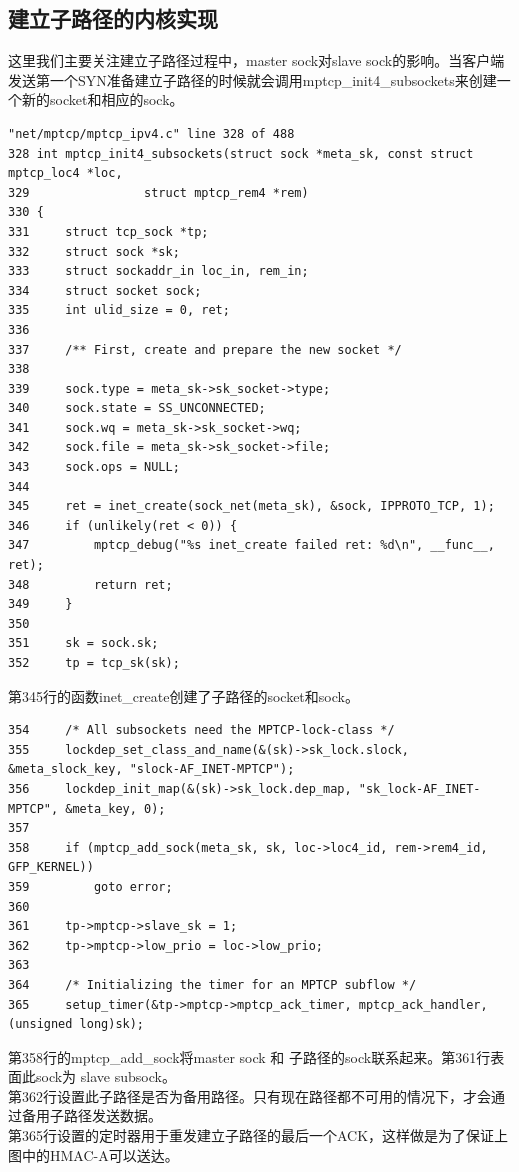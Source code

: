 \subsection{建立子路径的内核实现}
这里我们主要关注建立子路径过程中，master sock对slave sock的影响。当客户端发送第一个SYN准备建立子路径的时候就会调用mptcp\_init4\_subsockets来创建一个新的socket和相应的sock。
\small\begin{verbatim}
"net/mptcp/mptcp_ipv4.c" line 328 of 488
328 int mptcp_init4_subsockets(struct sock *meta_sk, const struct mptcp_loc4 *loc,
329                struct mptcp_rem4 *rem)
330 {
331     struct tcp_sock *tp;
332     struct sock *sk;
333     struct sockaddr_in loc_in, rem_in;
334     struct socket sock;
335     int ulid_size = 0, ret;
336
337     /** First, create and prepare the new socket */
338
339     sock.type = meta_sk->sk_socket->type;
340     sock.state = SS_UNCONNECTED;
341     sock.wq = meta_sk->sk_socket->wq;
342     sock.file = meta_sk->sk_socket->file;
343     sock.ops = NULL;
344
345     ret = inet_create(sock_net(meta_sk), &sock, IPPROTO_TCP, 1);
346     if (unlikely(ret < 0)) {
347         mptcp_debug("%s inet_create failed ret: %d\n", __func__, ret);
348         return ret;
349     }
350
351     sk = sock.sk;
352     tp = tcp_sk(sk);
\end{verbatim}\normalsize
第345行的函数inet\_create创建了子路径的socket和sock。
\small\begin{verbatim}
354     /* All subsockets need the MPTCP-lock-class */
355     lockdep_set_class_and_name(&(sk)->sk_lock.slock, &meta_slock_key, "slock-AF_INET-MPTCP");
356     lockdep_init_map(&(sk)->sk_lock.dep_map, "sk_lock-AF_INET-MPTCP", &meta_key, 0);
357
358     if (mptcp_add_sock(meta_sk, sk, loc->loc4_id, rem->rem4_id, GFP_KERNEL))
359         goto error;
360
361     tp->mptcp->slave_sk = 1;
362     tp->mptcp->low_prio = loc->low_prio;
363
364     /* Initializing the timer for an MPTCP subflow */
365     setup_timer(&tp->mptcp->mptcp_ack_timer, mptcp_ack_handler, (unsigned long)sk);
\end{verbatim}\normalsize
第358行的mptcp\_add\_sock将master sock 和 子路径的sock联系起来。第361行表面此sock为 slave subsock。\\
第362行设置此子路径是否为备用路径。只有现在路径都不可用的情况下，才会通过备用子路径发送数据。\\
第365行设置的定时器用于重发建立子路径的最后一个ACK，这样做是为了保证上图中的HMAC-A可以送达。

